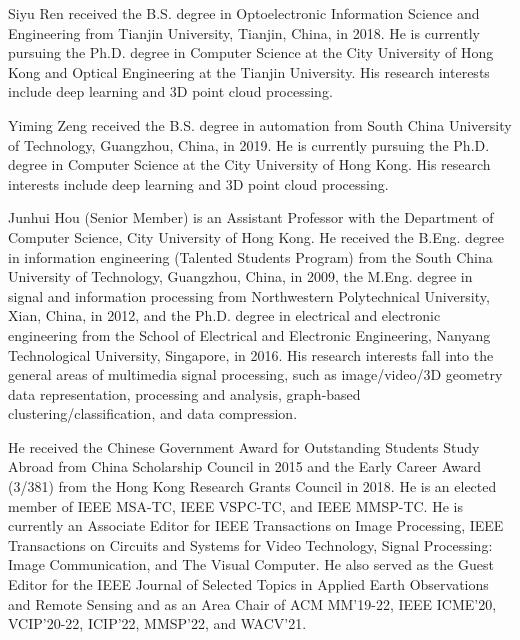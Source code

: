 \documentclass[lettersize,journal]{IEEEtran}
\begin{document}
\vspace{-10mm}
\begin{IEEEbiography}{Siyu Ren} received the B.S. degree in Optoelectronic Information Science and Engineering from Tianjin University, Tianjin, China, in 2018. 
He is currently pursuing the Ph.D. degree in Computer Science at the City University of Hong Kong and Optical Engineering at the Tianjin University. His research interests include deep learning and 3D point cloud processing.
\end{IEEEbiography}
\begin{IEEEbiography}{Yiming Zeng} received the B.S. degree in automation from South China University of Technology, Guangzhou, China, in 2019. 
He is currently pursuing the Ph.D. degree in Computer Science at the City University of Hong Kong.  His research interests include deep learning and 3D point cloud processing.
\end{IEEEbiography}
\begin{IEEEbiography}{Junhui Hou} (Senior Member)  is an Assistant Professor with the Department of Computer Science, City University of Hong Kong. He received the B.Eng. degree in information engineering (Talented Students Program) from the South China University of Technology, Guangzhou, China, in 2009, the M.Eng. degree in signal and information processing from Northwestern Polytechnical University, Xian, China, in 2012, and the Ph.D. degree in electrical and electronic engineering from the School of Electrical and Electronic Engineering, Nanyang Technological University, Singapore, in 2016. His research interests fall into the general areas of multimedia signal processing, such as image/video/3D geometry data representation, processing and analysis, graph-based clustering/classification, and data compression.

He received the Chinese Government Award for Outstanding Students Study Abroad from China Scholarship Council in 2015 and the Early Career Award (3/381) from the Hong Kong Research Grants Council in 2018. He is an elected member of IEEE MSA-TC, IEEE VSPC-TC, and IEEE MMSP-TC. He is currently an Associate Editor for IEEE Transactions on Image Processing, IEEE Transactions on Circuits and Systems for Video Technology, Signal Processing: Image Communication, and The Visual Computer. He also served as the Guest Editor for the IEEE Journal of Selected Topics in Applied Earth Observations and Remote Sensing and as an Area Chair of ACM MM’19-22, IEEE ICME’20, VCIP’20-22, ICIP’22, MMSP’22, and WACV’21.
\end{IEEEbiography}
\end{document}
